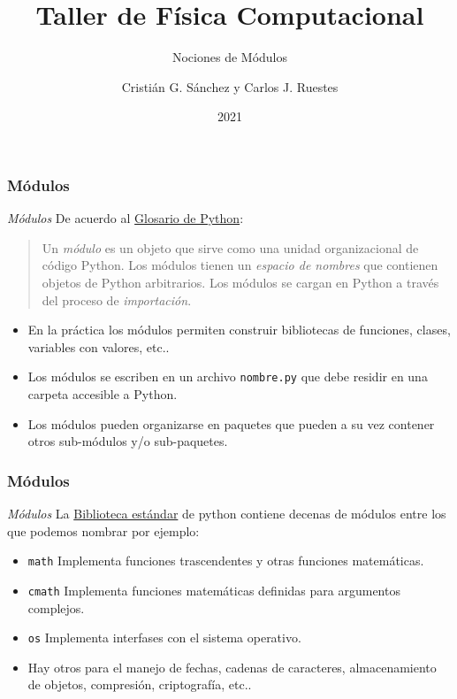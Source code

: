 \documentclass{beamer}
\title{Taller de Física Computacional}
\subtitle{Nociones de Módulos}
\author{Cristián G. Sánchez y Carlos J. Ruestes}
\date{2021}
\begin{document}
\frame{\titlepage}

\begin{frame}[fragile]
\frametitle{Módulos}
\begin{block}{{\em Módulos}}
De acuerdo al \href{https://docs.python.org/3/glossary.html}{Glosario de Python}:
\begin{quote}
Un {\em módulo} es un objeto que sirve como una unidad organizacional de código Python. Los módulos tienen un {\em espacio de nombres} que contienen objetos de Python arbitrarios. Los módulos se cargan en Python a través del proceso de {\em importación}.
\end{quote}
\end{block}
\begin{itemize}
\item En la práctica los módulos permiten construir bibliotecas de funciones, clases, variables con valores, etc..
\item Los módulos se escriben en un archivo {\tt nombre.py} que debe residir en una carpeta accesible a Python.
\item Los módulos pueden organizarse en paquetes que pueden a su vez contener otros sub-módulos y/o sub-paquetes.
\end{itemize}

\end{frame}

\begin{frame}[fragile]
\frametitle{Módulos}
\begin{block}{{\em Módulos}}
La \href{https://docs.python.org/3/library/index.html}{Biblioteca estándar} de python contiene decenas de módulos entre los que podemos nombrar por ejemplo:
\begin{itemize}
\item {\tt math} Implementa funciones trascendentes y otras funciones matemáticas.
\item {\tt cmath} Implementa funciones matemáticas definidas para argumentos complejos.
\item {\tt os} Implementa interfases con el sistema operativo.
\item Hay otros para el manejo de fechas, cadenas de caracteres, almacenamiento de objetos, compresión, criptografía, etc..
\end{itemize}
\end{block}
\end{frame}
\end{document}
